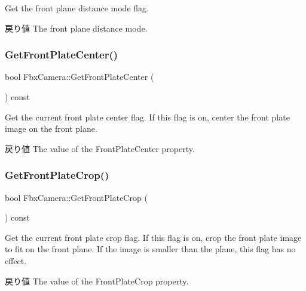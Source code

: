 Get the front plane distance mode flag. \begin{DoxyReturn}{戻り値}
The front plane distance mode. 
\end{DoxyReturn}
\mbox{\label{class_fbx_camera_a1ddaac65643a80442f19b5a330075903}} 
\subsubsection{\texorpdfstring{Get\+Front\+Plate\+Center()}{GetFrontPlateCenter()}}
{\footnotesize\ttfamily bool Fbx\+Camera\+::\+Get\+Front\+Plate\+Center (\begin{DoxyParamCaption}{ }\end{DoxyParamCaption}) const}

Get the current front plate center flag. If this flag is on, center the front plate image on the front plane. \begin{DoxyReturn}{戻り値}
The value of the Front\+Plate\+Center property. 
\end{DoxyReturn}
\mbox{\label{class_fbx_camera_a3b5f0677c20c4e648342949b7bf5798f}} 
\subsubsection{\texorpdfstring{Get\+Front\+Plate\+Crop()}{GetFrontPlateCrop()}}
{\footnotesize\ttfamily bool Fbx\+Camera\+::\+Get\+Front\+Plate\+Crop (\begin{DoxyParamCaption}{ }\end{DoxyParamCaption}) const}

Get the current front plate crop flag. If this flag is on, crop the front plate image to fit on the front plane. If the image is smaller than the plane, this flag has no effect. \begin{DoxyReturn}{戻り値}
The value of the Front\+Plate\+Crop property. 
\end{DoxyReturn}
\mbox{\label{class_fbx_camera_a212030735f4c855c485659b5551b3d7f}} 
